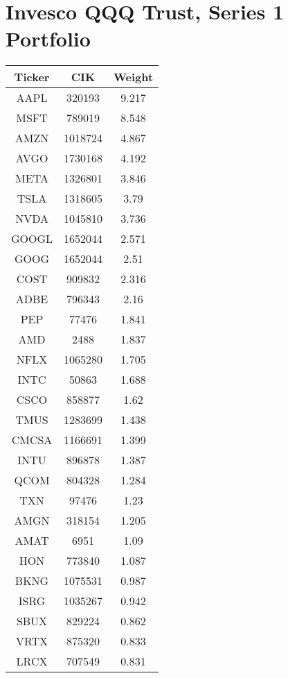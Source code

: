 \documentclass[logo,bsc,singlespacing,parskip]{infthesis}
\begin{document}
\chapter{Invesco QQQ Trust, Series 1 Portfolio \cite{InvescoQQQ}}
\begin{longtable}
            \footnotesize
                \begin{tabular}[t]{|c|c|c|}
                    \hline
                    \textbf{Ticker} & \textbf{CIK} & \textbf{Weight} \\ \hline
AAPL & 320193 & 9.217 \\ \hline
MSFT & 789019 & 8.548 \\ \hline
AMZN & 1018724 & 4.867 \\ \hline
AVGO & 1730168 & 4.192 \\ \hline
META & 1326801 & 3.846 \\ \hline
TSLA & 1318605 & 3.79 \\ \hline
NVDA & 1045810 & 3.736 \\ \hline
GOOGL & 1652044 & 2.571 \\ \hline
GOOG & 1652044 & 2.51 \\ \hline
COST & 909832 & 2.316 \\ \hline
ADBE & 796343 & 2.16 \\ \hline
PEP & 77476 & 1.841 \\ \hline
AMD & 2488 & 1.837 \\ \hline
NFLX & 1065280 & 1.705 \\ \hline
INTC & 50863 & 1.688 \\ \hline
CSCO & 858877 & 1.62 \\ \hline
TMUS & 1283699 & 1.438 \\ \hline
CMCSA & 1166691 & 1.399 \\ \hline
INTU & 896878 & 1.387 \\ \hline
QCOM & 804328 & 1.284 \\ \hline
TXN & 97476 & 1.23 \\ \hline
AMGN & 318154 & 1.205 \\ \hline
AMAT & 6951 & 1.09 \\ \hline
HON & 773840 & 1.087 \\ \hline
BKNG & 1075531 & 0.987 \\ \hline
ISRG & 1035267 & 0.942 \\ \hline
SBUX & 829224 & 0.862 \\ \hline
VRTX & 875320 & 0.833 \\ \hline
LRCX & 707549 & 0.831 \\ \hline

\end{tabular}
\end{longtable}
\end{document}
